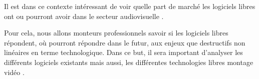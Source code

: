 Il est dans ce contexte intéressant de voir quelle part de marché les
logiciels libres ont ou pourront avoir dans le secteur %
audiovisuelle .

Pour cela, nous allons %
monteurs professionnels%
savoir si les logiciels libres répondent, où pourront répondre dans
le futur, aux enjeux que %
destructifs non linéaires en terme technologique. Dans
ce but, il sera important d'analyser les différents logiciels existants
mais aussi, les différentes technologies libres %
montage vidéo .
